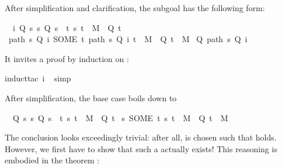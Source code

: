 \begin{isabellebody}
\begin{isamarkuptxt}%
\noindent
After simplification and clarification, the subgoal has the following form:
\begin{isabelle}%
\ {}{\isachardot}\ {\isasymAnd}i{\isachardot}\ {\isasymlbrakk}Q\ s{\isacharsemicolon}\ {\isasymforall}s{\isachardot}\ Q\ s\ {\isasymlongrightarrow}\ {\isacharparenleft}{\isasymexists}t{\isachardot}\ {\isacharparenleft}s{\isacharcomma}\ t{\isacharparenright}\ {\isasymin}\ M\ {\isasymand}\ Q\ t{\isacharparenright}{\isasymrbrakk}\isanewline
{}\ {\isacharparenleft}path\ s\ Q\ i{\isacharcomma}\ SOME\ t{\isachardot}\ {\isacharparenleft}path\ s\ Q\ i{\isacharcomma}\ t{\isacharparenright}\ {\isasymin}\ M\ {\isasymand}\ Q\ t{\isacharparenright}\ {\isasymin}\ M\ {\isasymand}\isanewline
{}Q\ {\isacharparenleft}path\ s\ Q\ i{\isacharparenright}%
\end{isabelle}
It invites a proof by induction on :%
\end{isamarkuptxt}%
\isamarkuptrue%
\isamarkupfalse%
{\isacharparenleft}induct{\isacharunderscore}tac\ i{\isacharparenright}\isanewline
\ \isamarkupfalse%
{\isacharparenleft}simp{\isacharparenright}%
\begin{isamarkuptxt}%
\noindent
After simplification, the base case boils down to
\begin{isabelle}%
\ {}{\isachardot}\ {\isasymlbrakk}Q\ s{\isacharsemicolon}\ {\isasymforall}s{\isachardot}\ Q\ s\ {\isasymlongrightarrow}\ {\isacharparenleft}{\isasymexists}t{\isachardot}\ {\isacharparenleft}s{\isacharcomma}\ t{\isacharparenright}\ {\isasymin}\ M\ {\isasymand}\ Q\ t{\isacharparenright}{\isasymrbrakk}\isanewline
{}\ {\isacharparenleft}s{\isacharcomma}\ SOME\ t{\isachardot}\ {\isacharparenleft}s{\isacharcomma}\ t{\isacharparenright}\ {\isasymin}\ M\ {\isasymand}\ Q\ t{\isacharparenright}\ {\isasymin}\ M%
\end{isabelle}
The conclusion looks exceedingly trivial: after all,  is chosen such that 
holds. However, we first have to show that such a  actually exists! This reasoning
is embodied in the theorem :
\begin{isabelle}%

\end{isabelle}
\end{isamarkuptxt}
\end{isabellebody}
